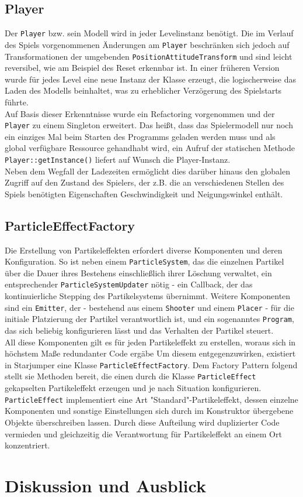 \documentclass{llncs}
\begin{document}
\subsection{Player}
Der \texttt{Player} bzw. sein Modell wird in jeder Levelinstanz ben\"otigt. Die im Verlauf des Spiels vorgenommenen \"Anderungen
am \texttt{Player} beschr\"anken sich jedoch auf Transformationen der umgebenden \texttt{PositionAttitudeTransform} und sind leicht reversibel,
wie am Beispiel des Reset erkennbar ist. In einer fr\"uheren Version wurde f\"ur jedes Level eine neue Instanz der Klasse
erzeugt, die logischerweise das Laden des Modells beinhaltet, was zu erheblicher Verz\"ogerung des Spielstarts f\"uhrte.\\
Auf Basis dieser Erkenntnisse wurde ein Refactoring vorgenommen und der \texttt{Player} zu einem Singleton erweitert. Das hei\ss t,
dass das Spielermodell nur noch ein einziges Mal beim Starten des Programms geladen werden muss und als global verf\"ugbare
Ressource gehandhabt wird, ein Aufruf der statischen Methode \texttt{Player::getInstance()} liefert auf Wunsch die Player-Instanz.\\
Neben dem Wegfall der Ladezeiten erm\"oglicht dies dar\"uber hinaus den globalen Zugriff auf den Zustand des Spielers,
der z.B. die an verschiedenen Stellen des Spiels ben\"otigten Eigenschaften Geschwindigkeit und Neigungswinkel enth\"alt.

\subsection{ParticleEffectFactory}
Die Erstellung von Partikeleffekten erfordert diverse Komponenten und deren Konfiguration. So ist neben einem \texttt{ParticleSystem}, das
die einzelnen Partikel \"uber die Dauer ihres Bestehens einschlie\ss lich ihrer L\"oschung verwaltet, ein entsprechender
\texttt{ParticleSystemUpdater} n\"otig - ein Callback, der das kontinuierliche Stepping des Partikelsystems \"ubernimmt. Weitere Komponenten
sind ein \texttt{Emitter}, der - bestehend aus einem \texttt{Shooter} und einem \texttt{Placer} - f\"ur die initiale Platzierung der Partikel verantwortlich
ist, und ein sogenanntes \texttt{Program}, das sich beliebig konfigurieren l\"asst und das Verhalten der Partikel steuert.\\
All diese Komponenten gilt es f\"ur jeden Partikeleffekt zu erstellen, woraus sich in h\"ochstem Ma\ss e redundanter Code erg\"abe
Um diesem entgegenzuwirken, existiert in Starjumper eine Klasse \texttt{ParticleEffectFactory}. Dem Factory Pattern folgend stellt sie Methoden
bereit, die einen durch die Klasse \texttt{ParticleEffect} gekapselten Partikeleffekt erzeugen und je nach Situation konfigurieren.\\
\texttt{ParticleEffect} implementiert eine Art "Standard"-Partikeleffekt, dessen einzelne Komponenten und sonstige Einstellungen sich
durch im Konstruktor \"ubergebene Objekte \"uberschreiben lassen. Durch diese Aufteilung wird duplizierter Code vermieden und
gleichzeitig die Verantwortung f\"ur Partikeleffekt an einem Ort konzentriert.

\section{Diskussion und Ausblick}
\end{document}

